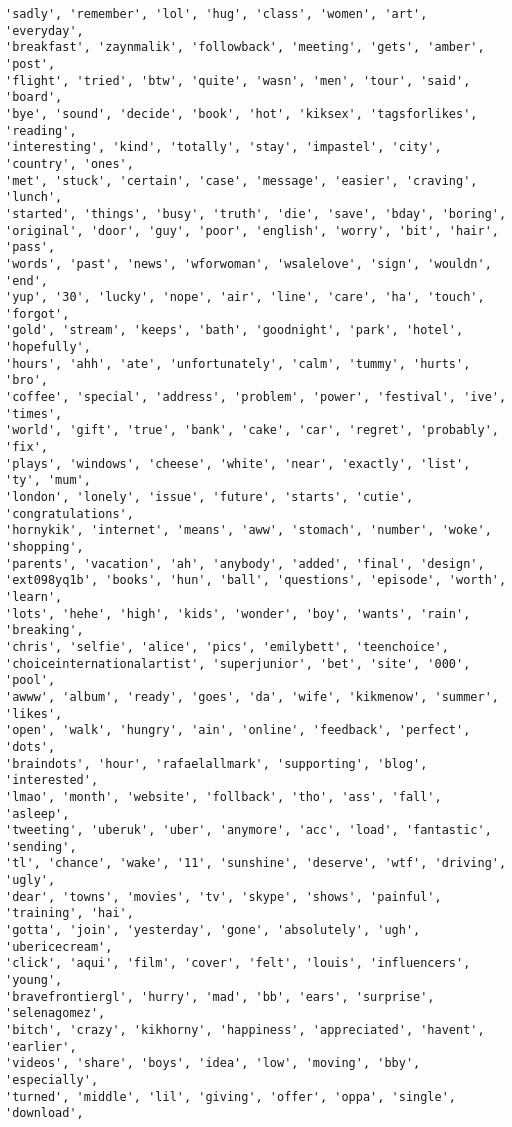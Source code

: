 \documentclass[11pt]{article}
\begin{document}
\begin{Verbatim}[commandchars=\\\{\}]
'sadly', 'remember', 'lol', 'hug', 'class', 'women', 'art', 'everyday',
'breakfast', 'zaynmalik', 'followback', 'meeting', 'gets', 'amber', 'post',
'flight', 'tried', 'btw', 'quite', 'wasn', 'men', 'tour', 'said', 'board',
'bye', 'sound', 'decide', 'book', 'hot', 'kiksex', 'tagsforlikes', 'reading',
'interesting', 'kind', 'totally', 'stay', 'impastel', 'city', 'country', 'ones',
'met', 'stuck', 'certain', 'case', 'message', 'easier', 'craving', 'lunch',
'started', 'things', 'busy', 'truth', 'die', 'save', 'bday', 'boring',
'original', 'door', 'guy', 'poor', 'english', 'worry', 'bit', 'hair', 'pass',
'words', 'past', 'news', 'wforwoman', 'wsalelove', 'sign', 'wouldn', 'end',
'yup', '30', 'lucky', 'nope', 'air', 'line', 'care', 'ha', 'touch', 'forgot',
'gold', 'stream', 'keeps', 'bath', 'goodnight', 'park', 'hotel', 'hopefully',
'hours', 'ahh', 'ate', 'unfortunately', 'calm', 'tummy', 'hurts', 'bro',
'coffee', 'special', 'address', 'problem', 'power', 'festival', 'ive', 'times',
'world', 'gift', 'true', 'bank', 'cake', 'car', 'regret', 'probably', 'fix',
'plays', 'windows', 'cheese', 'white', 'near', 'exactly', 'list', 'ty', 'mum',
'london', 'lonely', 'issue', 'future', 'starts', 'cutie', 'congratulations',
'hornykik', 'internet', 'means', 'aww', 'stomach', 'number', 'woke', 'shopping',
'parents', 'vacation', 'ah', 'anybody', 'added', 'final', 'design',
'ext098yq1b', 'books', 'hun', 'ball', 'questions', 'episode', 'worth', 'learn',
'lots', 'hehe', 'high', 'kids', 'wonder', 'boy', 'wants', 'rain', 'breaking',
'chris', 'selfie', 'alice', 'pics', 'emilybett', 'teenchoice',
'choiceinternationalartist', 'superjunior', 'bet', 'site', '000', 'pool',
'awww', 'album', 'ready', 'goes', 'da', 'wife', 'kikmenow', 'summer', 'likes',
'open', 'walk', 'hungry', 'ain', 'online', 'feedback', 'perfect', 'dots',
'braindots', 'hour', 'rafaelallmark', 'supporting', 'blog', 'interested',
'lmao', 'month', 'website', 'follback', 'tho', 'ass', 'fall', 'asleep',
'tweeting', 'uberuk', 'uber', 'anymore', 'acc', 'load', 'fantastic', 'sending',
'tl', 'chance', 'wake', '11', 'sunshine', 'deserve', 'wtf', 'driving', 'ugly',
'dear', 'towns', 'movies', 'tv', 'skype', 'shows', 'painful', 'training', 'hai',
'gotta', 'join', 'yesterday', 'gone', 'absolutely', 'ugh', 'ubericecream',
'click', 'aqui', 'film', 'cover', 'felt', 'louis', 'influencers', 'young',
'bravefrontiergl', 'hurry', 'mad', 'bb', 'ears', 'surprise', 'selenagomez',
'bitch', 'crazy', 'kikhorny', 'happiness', 'appreciated', 'havent', 'earlier',
'videos', 'share', 'boys', 'idea', 'low', 'moving', 'bby', 'especially',
'turned', 'middle', 'lil', 'giving', 'offer', 'oppa', 'single', 'download',

\end{Verbatim}
\end{document}
